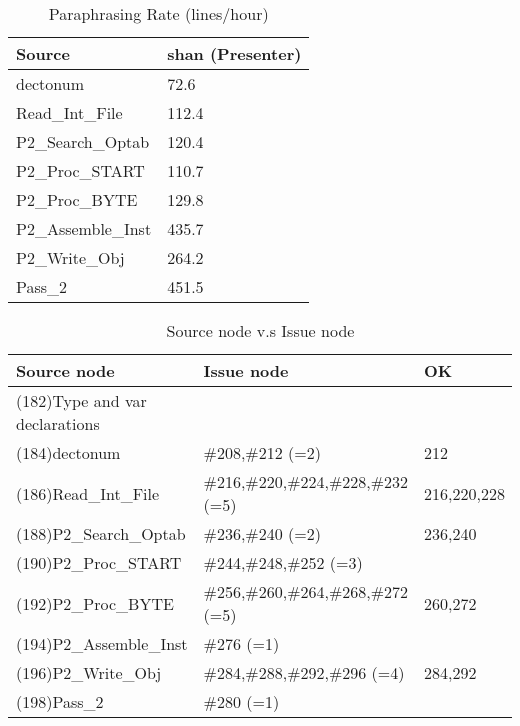 \begin{table}[hb]
\begin{center}
\begin{tabular}{|l|l|}
\hline
Source & shan (Presenter)\\
\hline
dectonum & 72.6\\
Read\_Int\_File & 112.4\\
P2\_Search\_Optab & 120.4\\
P2\_Proc\_START & 110.7\\
P2\_Proc\_BYTE & 129.8\\
P2\_Assemble\_Inst & 435.7\\
P2\_Write\_Obj & 264.2\\
Pass\_2 & 451.5\\
\hline
\end{tabular}
\end{center}
\caption{Paraphrasing Rate (lines/hour)}
\end{table}


\begin{table}[hb]
\begin{center}
\begin{tabular}{|l|l|l|}
\hline
Source node & Issue node  & OK\\
\hline
(182)Type and var declarations &  & \\
(184)dectonum & \#208,\#212 (=2) & 212\\
(186)Read\_Int\_File & \#216,\#220,\#224,\#228,\#232 (=5) & 216,220,228\\
(188)P2\_Search\_Optab & \#236,\#240 (=2) & 236,240\\
(190)P2\_Proc\_START & \#244,\#248,\#252 (=3) & \\
(192)P2\_Proc\_BYTE & \#256,\#260,\#264,\#268,\#272 (=5) & 260,272\\
(194)P2\_Assemble\_Inst & \#276 (=1) & \\
(196)P2\_Write\_Obj & \#284,\#288,\#292,\#296 (=4) & 284,292\\
(198)Pass\_2 & \#280 (=1) & \\
\hline
\end{tabular}
\caption{Source node v.s Issue node}
\end{center}
\end{table}

